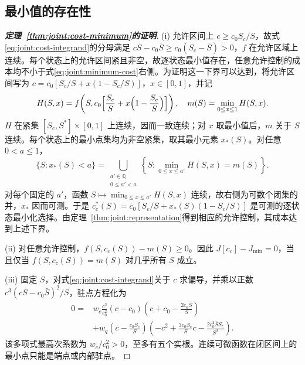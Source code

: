 \subsection{最小值的存在性}
\label{sec:proof:cost-minimum}
\begin{proof}[\normalfont\bfseries 定理~\ref{thm:joint:cost-minimum}的证明]
(i) 允许区间上 $c\ge c_0S_c/S$，故式\eqref{eq:joint:cost-integrand}的分母满足
$cS-c_0\bar S\ge c_0(S_c-\bar S)>0$，$f$ 在允许区域上连续。每个状态上的允许区间紧且非空，故逐状态最小值存在，任意允许控制的成本均不小于式\eqref{eq:joint:minimum-cost}右侧。为证明这一下界可以达到，将允许区间写为
$c=c_0[S_c/S+x(1-S_c/S)]$，$x\in[0,1]$，并记
\[
H(S,x)=f\!\left(S,c_0\Bigl[\frac{S_c}{S}+x\Bigl(1-\frac{S_c}{S}\Bigr)\Bigr]\right),
\quad m(S)=\min_{0\le x\le1}H(S,x).
\]
$H$ 在紧集 $[S_c,S^*]\times[0,1]$ 上连续，因而一致连续；对 $x$ 取最小值后，$m$ 关于 $S$ 连续。每个状态上的最小点集均为非空紧集，取其最小元素 $x_*(S)$。对任意 $0<a\le1$，
\[
\{S:x_*(S)<a\}
=\bigcup_{\substack{a'\in\mathbb Q\\0\le a'<a}}
\left\{S:\min_{0\le x\le a'}H(S,x)=m(S)\right\}.
\]
对每个固定的 $a'$，函数 $S\mapsto\min_{0\le x\le a'}H(S,x)$ 连续，故右侧为可数个闭集的并，$x_*$ 因而可测。于是
$c_c^*(S)=c_0[S_c/S+x_*(S)(1-S_c/S)]$
是可测的逐状态最小化选择。由定理~\ref{thm:joint:representation}得到相应的允许控制，其成本达到上述下界。

(ii) 对任意允许控制，$f(S,c_c(S))-m(S)\ge0$。因此 $J[c_c]-J_{\min}=0$，当且仅当 $f(S,c_c(S))=m(S)$ 对几乎所有 $S$ 成立。

(iii) 固定 $S$，对式\eqref{eq:joint:cost-integrand}关于 $c$ 求偏导，并乘以正数
$c^3(cS-c_0\bar S)^2/S$，驻点方程化为
\begin{equation}
\begin{split}
0={}&w_c\frac{c^3}{c_0^2}(c-c_0)
\left(c+c_0-\frac{2c_0\bar S}{S}\right)\\
&+w_q\left(c-\frac{c_0S_c}{S}\right)
\left(-c^2+\frac{3c_0S_c}{S}c-
\frac{2c_0^2\bar S S_c}{S^2}\right).
\end{split}
\label{eq:joint:stationary}
\end{equation}
该多项式最高次系数为 $w_c/c_0^2>0$，至多有五个实根。连续可微函数在闭区间上的最小点只能是端点或内部驻点。
\end{proof}

